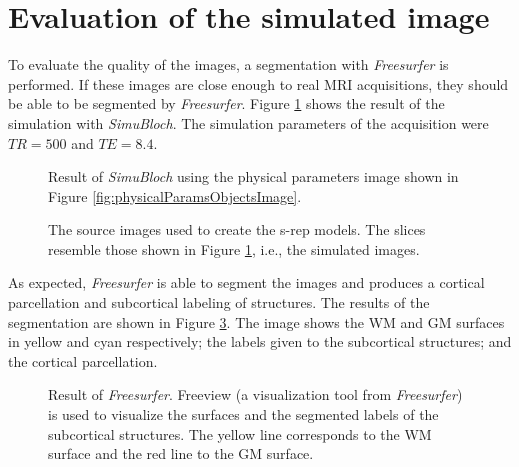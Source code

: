 \section{Evaluation of the simulated image}
\label{sec:EvaluationSimulation}

To evaluate the quality of the images, a segmentation with \textit{Freesurfer} is performed. 
If these images are close enough to real MRI acquisitions, they should be able to be segmented by
\textit{Freesurfer}. Figure \ref{fig:physicalParamsObjectsImageSimu} shows the result of the simulation with \textit{SimuBloch}.
The simulation parameters of the acquisition were $TR=500$ and $TE=8.4$.

\begin{figure} 
 \centering   
\caption[Simulated brain MRI for three subjects.]{Result of \textit{SimuBloch} using the physical parameters image shown in Figure \ref{fig:physicalParamsObjectsImage}.}
 \label{fig:physicalParamsObjectsImageSimu}  
\end{figure}

\begin{figure} 
 \centering   
\caption[Original brain MRI for three subjects.]{The source images used to create the s-rep models. The slices resemble those shown in Figure \ref{fig:physicalParamsObjectsImageSimu}, i.e., the simulated images.}
 \label{fig:physicalParamsObjectsImageOrig}  
\end{figure}

As expected, \textit{Freesurfer} is able to segment the images and produces a cortical parcellation and subcortical labeling of structures.
The results of the segmentation are shown in Figure \ref{fig:physicalParamsObjectsSegmentedImage}.
The image shows the WM and GM surfaces in yellow and cyan respectively;
the labels given to the subcortical structures; and the cortical parcellation.
\begin{figure} 
 \centering   
\caption[Segmented MRI for three simulated subjects.]{Result of \textit{Freesurfer}. Freeview (a visualization tool from \textit{Freesurfer}) is used to 
							visualize the surfaces and the segmented labels of the subcortical structures.
							The yellow line corresponds to the WM surface and the red line to the GM surface.}
 \label{fig:physicalParamsObjectsSegmentedImage}  
\end{figure}

